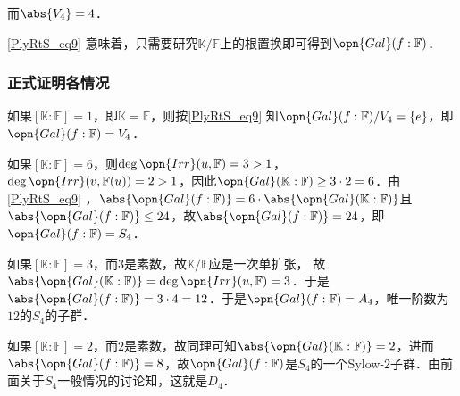 而$\abs{V_4}=4$．

\autoref{PlyRtS_eq9} 意味着，只需要研究$\mathbb{K}/\mathbb{F}$上的根置换即可得到$\opn{Gal}(f:\mathbb{F})$．

\subsubsection{正式证明各情况}

如果$[\mathbb{K}:\mathbb{F}]=1$，即$\mathbb{K}=\mathbb{F}$，则按\autoref{PlyRtS_eq9} 知$\opn{Gal}(f:\mathbb{F})/V_4=\{e\}$，即$\opn{Gal}(f:\mathbb{F})=V_4$．

如果$[\mathbb{K}:\mathbb{F}]=6$，则$\deg\opn{Irr}(u, \mathbb{F})=3>1$，$\deg\opn{Irr}(v, \mathbb{F}(u))=2>1$，因此$\opn{Gal}(\mathbb{K}:\mathbb{F})\geq 3\cdot 2 =6$．由\autoref{PlyRtS_eq9} ，$\abs{\opn{Gal}(f:\mathbb{F})}=6\cdot\abs{\opn{Gal}(\mathbb{K}:\mathbb{F})}$且$\abs{\opn{Gal}(f:\mathbb{F})}\leq 24$，故$\abs{\opn{Gal}(f:\mathbb{F})}=24$，即$\opn{Gal}(f:\mathbb{F})=S_4$．

如果$[\mathbb{K}:\mathbb{F}]=3$，而$3$是素数，故$\mathbb{K}/\mathbb{F}$应是一次单扩张，%
故$\abs{\opn{Gal}(\mathbb{K}:\mathbb{F})}=\deg\opn{Irr}(u, \mathbb{F})=3$．于是$\abs{\opn{Gal}(f:\mathbb{F})}=3\cdot 4=12$．于是$\opn{Gal}(f:\mathbb{F})=A_4$，唯一阶数为$12$的$S_4$的子群．

如果$[\mathbb{K}:\mathbb{F}]=2$，而$2$是素数，故同理可知$\abs{\opn{Gal}(\mathbb{K}:\mathbb{F})}=2$，进而$\abs{\opn{Gal}(f:\mathbb{F})}=8$，故$\opn{Gal}(f:\mathbb{F})$是$S_4$的一个Sylow-$2$子群．由前面关于$S_4$一般情况的讨论知，这就是$D_4$．







